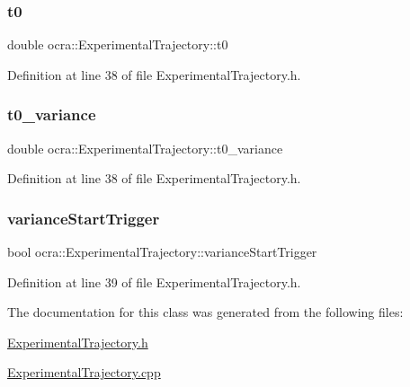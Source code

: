 \subsubsection{\texorpdfstring{t0}{t0}}
{\footnotesize\ttfamily double ocra\+::\+Experimental\+Trajectory\+::t0\hspace{0.3cm}{\ttfamily [protected]}}



Definition at line 38 of file Experimental\+Trajectory.\+h.

\hypertarget{classocra_1_1ExperimentalTrajectory_a90502f229cbccfd19bd884d7b87f734d}{}\label{classocra_1_1ExperimentalTrajectory_a90502f229cbccfd19bd884d7b87f734d} 
\subsubsection{\texorpdfstring{t0\+\_\+variance}{t0\_variance}}
{\footnotesize\ttfamily double ocra\+::\+Experimental\+Trajectory\+::t0\+\_\+variance\hspace{0.3cm}{\ttfamily [protected]}}



Definition at line 38 of file Experimental\+Trajectory.\+h.

\hypertarget{classocra_1_1ExperimentalTrajectory_ab10b037615b07e20b0d6f81c48b7fd23}{}\label{classocra_1_1ExperimentalTrajectory_ab10b037615b07e20b0d6f81c48b7fd23} 
\subsubsection{\texorpdfstring{variance\+Start\+Trigger}{varianceStartTrigger}}
{\footnotesize\ttfamily bool ocra\+::\+Experimental\+Trajectory\+::variance\+Start\+Trigger\hspace{0.3cm}{\ttfamily [protected]}}



Definition at line 39 of file Experimental\+Trajectory.\+h.



The documentation for this class was generated from the following files\+:\begin{DoxyCompactItemize}
\item 
\hyperlink{ExperimentalTrajectory_8h}{Experimental\+Trajectory.\+h}\item 
\hyperlink{ExperimentalTrajectory_8cpp}{Experimental\+Trajectory.\+cpp}\end{DoxyCompactItemize}
